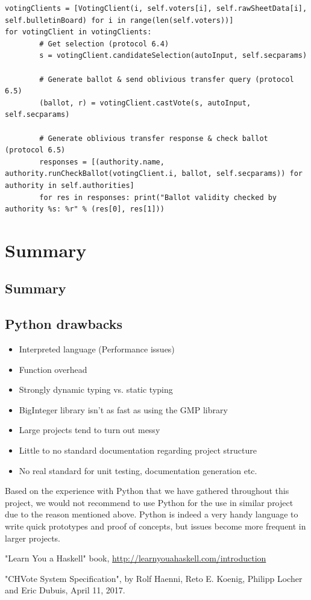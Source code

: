 \documentclass[a4paper,12pt]{report}
\begin{document}
\begin{verbatim}
votingClients = [VotingClient(i, self.voters[i], self.rawSheetData[i], self.bulletinBoard) for i in range(len(self.voters))]
for votingClient in votingClients:
		# Get selection (protocol 6.4)
		s = votingClient.candidateSelection(autoInput, self.secparams)

		# Generate ballot & send oblivious transfer query (protocol 6.5)
		(ballot, r) = votingClient.castVote(s, autoInput, self.secparams)

		# Generate oblivious transfer response & check ballot (protocol 6.5)
		responses = [(authority.name, authority.runCheckBallot(votingClient.i, ballot, self.secparams)) for authority in self.authorities]
		for res in responses: print("Ballot validity checked by authority %s: %r" % (res[0], res[1]))
\end{verbatim}

\chapter{Summary}
\section{Summary}
\section{Python drawbacks}

\begin{itemize}
	\item Interpreted language (Performance issues)
	\item Function overhead
	\item Strongly dynamic typing vs. static typing
	\item BigInteger library isn’t as fast as using the GMP library
	\item Large projects tend to turn out messy
	\item Little to no standard documentation regarding project structure
	\item No real standard for unit testing, documentation generation etc.
\end{itemize}

Based on the experience with Python that we have gathered throughout this project, we would not recommend to use Python for the use in similar project due to the reason mentioned above. Python is indeed a very handy language to write quick prototypes and proof of concepts, but issues become more frequent in larger projects.

\begin{thebibliography}{999}
	"Learn You a Haskell" book, \url{http://learnyouahaskell.com/introduction}

	"CHVote System Specification", by Rolf Haenni, Reto E. Koenig, Philipp Locher and Eric Dubuis, April 11, 2017.

\end{thebibliography}
\end{document}
